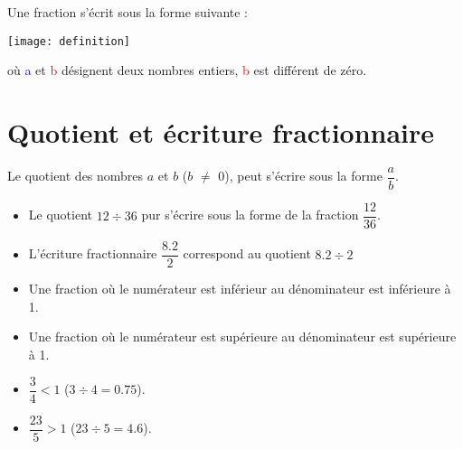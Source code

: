 \documentclass[12pt,a4paper]{article}
\begin{document}
\begin{mydef}
	Une fraction s'écrit sous la forme suivante :
	
	\begin{center}
		\texttt{[image: definition]}
	\end{center}
	
	où \textcolor{blue}{a} et \textcolor{red}{b} désignent deux nombres entiers, \textcolor{red}{b} est différent de zéro.
\end{mydef}

\section{Quotient et écriture fractionnaire}

	\begin{mydef}
		Le quotient des nombres $a$ et $b$ ($b$ $\neq$ 0), peut s'écrire sous la forme $\dfrac{a}{b}$.
	\end{mydef}

	\begin{myexs}
		\begin{itemize}
			\item  Le quotient $12 \div 36$ pur s'écrire sous la forme de la fraction $\dfrac{12}{36}$.
			
			\item L'écriture fractionnaire $\dfrac{\num{8,2}}{2}$ correspond au quotient $\num{8,2} \div 2$
		\end{itemize}
	\end{myexs}

	\begin{myprops}
		
		\begin{itemize}
			\item Une fraction où le numérateur est inférieur au dénominateur est inférieure à 1. 
			\item Une fraction où le numérateur est supérieure au dénominateur est supérieure à 1.
		\end{itemize}
	\end{myprops}

	\begin{myexs}
		\begin{itemize}
			\item  $\dfrac{3}{4} < 1$ ($3 \div 4 = \num{0.75}$).
			
			\item $\dfrac{23}{5} > 1$ ($23 \div 5 = \num{4.6}$).
		\end{itemize}
	\end{myexs}
\end{document}
